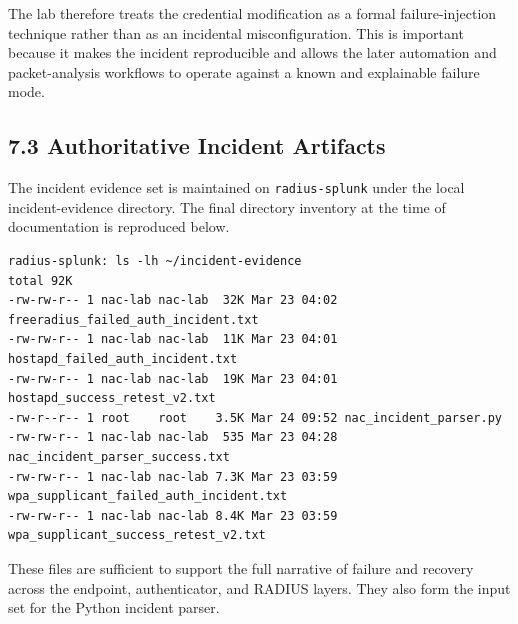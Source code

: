 \documentclass[11pt]{article}
\begin{document}
The lab therefore treats the credential modification as a formal failure-injection technique rather than as an incidental misconfiguration. This is important because it makes the incident reproducible and allows the later automation and packet-analysis workflows to operate against a known and explainable failure mode.


\subsection{7.3 Authoritative Incident Artifacts}
\label{sec:authoritative-incident-artifacts}

The incident evidence set is maintained on \texttt{radius-splunk} under the local incident-evidence directory. The final directory inventory at the time of documentation is reproduced below.


\begin{verbatim}
radius-splunk: ls -lh ~/incident-evidence
total 92K
-rw-rw-r-- 1 nac-lab nac-lab  32K Mar 23 04:02 freeradius_failed_auth_incident.txt
-rw-rw-r-- 1 nac-lab nac-lab  11K Mar 23 04:01 hostapd_failed_auth_incident.txt
-rw-rw-r-- 1 nac-lab nac-lab  19K Mar 23 04:01 hostapd_success_retest_v2.txt
-rw-r--r-- 1 root    root    3.5K Mar 24 09:52 nac_incident_parser.py
-rw-rw-r-- 1 nac-lab nac-lab  535 Mar 23 04:28 nac_incident_parser_success.txt
-rw-rw-r-- 1 nac-lab nac-lab 7.3K Mar 23 03:59 wpa_supplicant_failed_auth_incident.txt
-rw-rw-r-- 1 nac-lab nac-lab 8.4K Mar 23 03:59 wpa_supplicant_success_retest_v2.txt
\end{verbatim}

These files are sufficient to support the full narrative of failure and recovery across the endpoint, authenticator, and RADIUS layers. They also form the input set for the Python incident parser.
\end{document}
